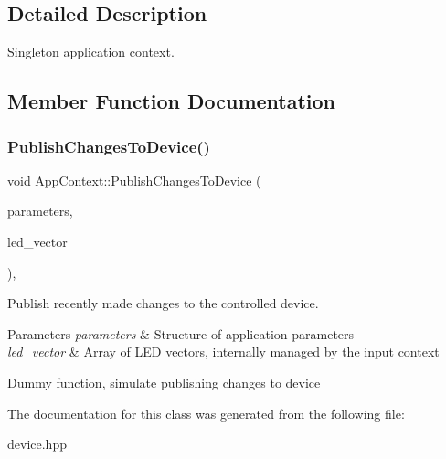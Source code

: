 \subsection{Detailed Description}
Singleton application context. 

\subsection{Member Function Documentation}
\mbox{\label{classAppContext_a9db79afff28d55fdcff4194befb585c7}} 
\subsubsection{\texorpdfstring{Publish\+Changes\+To\+Device()}{PublishChangesToDevice()}}
{\footnotesize\ttfamily void App\+Context\+::\+Publish\+Changes\+To\+Device (\begin{DoxyParamCaption}\item[{const \hyperlink{structAppParameters}{App\+Parameters} \&}]{parameters,  }\item[{const std\+::vector$<$ \hyperlink{classLEDContext}{L\+E\+D\+Context} $>$ \&}]{led\+\_\+vector }\end{DoxyParamCaption})\hspace{0.3cm}{\ttfamily [inline]}, {\ttfamily [noexcept]}}



Publish recently made changes to the controlled device. 


\begin{DoxyParams}{Parameters}
{\em parameters} & Structure of application parameters \\
\hline
{\em led\+\_\+vector} & Array of L\+ED vectors, internally managed by the input context \\
\hline
\end{DoxyParams}
Dummy function, simulate publishing changes to device

The documentation for this class was generated from the following file\+:\begin{DoxyCompactItemize}
\item 
device.\+hpp\end{DoxyCompactItemize}
